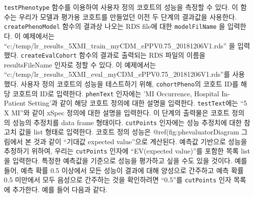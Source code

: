 \documentclass[10.5pt]{book}
\theoremstyle{definition}
\theoremstyle{definition}
\theoremstyle{definition}
\theoremstyle{remark}
\begin{document}
\texttt{testPhenotype} 함수를 이용하여 사용자 정의 코호트의 성능을
측정할 수 있다. 이 함수는 우리가 모델과 평가용 코호트를 만들었던 이전 두
단계의 결과값을 사용한다. \texttt{createPhenoModel} 함수의 결과상 나오는
RDS file에 대한 \texttt{modelFilName} 을 입력한다. 이 예제에서는
``c:/temp/lr\_results\_5XMI\_train\_myCDM\_ePPV0.75\_20181206V1.rds'' 을
입력했다. \texttt{createEvalCohort} 함수의 결과로 출력되는 RDS 파일의
이름을 resultsFileName 인자로 정할 수 있다. 이 예제에서는
``c:/temp/lr\_results\_5XMI\_eval\_myCDM\_ePPV0.75\_20181206V1.rds''를
사용했다. 사용자 정의 코호트의 성능을 테스트하기 위해,
\texttt{cohortPheno}의 코호트 ID를 해당 코호트의 ID로 입력한다.
\texttt{phenText} 인자에는 'MI Occurrence, Hospital In-Patient
Setting'과 같이 해당 코호트 정의에 대한 설명을 입력한다.
\texttt{testText}에는 ``5 X MI''와 같이 xSpec 정의에 대한 설명을
입력한다. 이 단계의 출력물은 코호트 정의의 성능의 추정치를 data frame
형태이다. \texttt{cutPoints} 인자에는 성능 추정치에 대한 참고치 값을
list 형태로 입력한다. 코호트 정의 성능은 @ref(fig:phevaluatorDiagram
그림에서 본 것과 같이 ``기대값 expected value''으로 계산된다. 예측값
기반으로 성능을 추정하기 위하여, 우리는 \texttt{cutPoints} 인자에
``EV(expected value)''를 포함한 목록 list을 입력한다. 특정한 예측값을
기준으로 성능을 평가하고 싶을 수도 있을 것이다. 예를 들어, 예측 확률 0.5
이상에서 모든 성능이 결과에 대해 양성으로 간주하고 예측 확률 0.5
미만에서 모두 음성으로 간주하는 것을 확인하려면 ``0.5''를
\texttt{cutPoints} 인자 목록에 추가한다. 예를 들어 다음과 같다.
\end{document}
